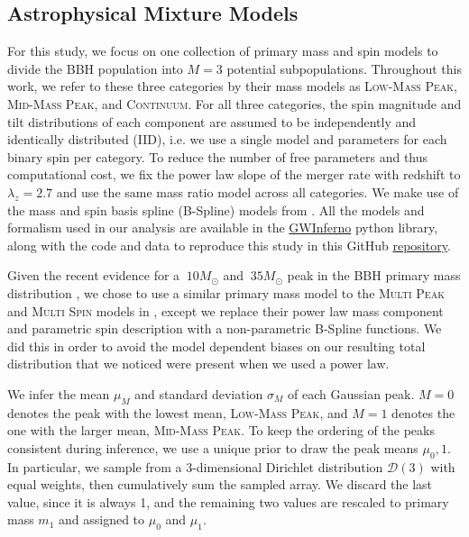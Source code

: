 \subsection{Astrophysical Mixture Models} \label{sec:astromodels}

For this study, we focus on one collection of primary mass and spin models to divide the BBH population into $M=3$ potential subpopulations. Throughout this work, we refer to these three categories by their mass models as \textsc{Low-Mass Peak}, \textsc{Mid-Mass Peak}, and \textsc{Continuum}. For all three categories, the spin magnitude and tilt distributions of each component are assumed to be independently and identically distributed (IID), i.e. we use a single model and parameters for each binary spin per category. To reduce the number of free parameters and thus computational cost, we fix the power law slope of the merger rate with redshift to $\lambda_z=2.7$ and use the same mass ratio model across all categories. We make use of the mass and spin basis spline (B-Spline) models from \cite{2022arXiv221012834E}. All the models and formalism used in our analysis are available in the \href{https://git.ligo.org/bruce.edelman/gwinferno}{GWInferno} python library, along with the code and data to reproduce this study in this GitHub \href{https://github.com/jaxeng/paper}{repository}. 

Given the recent evidence for a $~10 M_{\odot}$ and $~35 M_{\odot}$ peak in the BBH primary mass distribution \citep{2111.03634, 2022ApJ...928..155T, 10.3847/2041-8213/aa9bf6, 10.3847/1538-4357/aab34c, 10.3847/2041-8213/ab3800, 2021ApJ...913L...7A}, we chose to use a similar primary mass model to the \textsc{Multi Peak} and \textsc{Multi Spin} models in \cite{2021ApJ...913L...7A}, except we replace their power law mass component and parametric spin description with a non-parametric B-Spline functions. We did this in order to avoid the model dependent biases on our resulting total distribution that we noticed were present when we used a power law.

We infer the mean $\mu_M$ and standard deviation $\sigma_M$ of each Gaussian peak. $M=0$ denotes the peak with the lowest mean, \textsc{Low-Mass Peak}, and $M=1$ denotes the one with the larger mean, \textsc{Mid-Mass Peak}. To keep the ordering of the peaks consistent during inference, we use a unique prior to draw the peak means $\mu_0,1$. In particular, we sample from a 3-dimensional Dirichlet distribution $\mathcal{D}(3)$ with equal weights, then cumulatively sum the sampled array. We discard the last value, since it is always 1, and the remaining two values are rescaled to primary mass $m_1$ and assigned to $\mu_0$ and $\mu_1$. 

